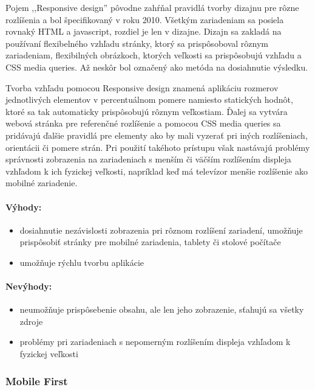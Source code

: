 Pojem ,,Responsive design'' pôvodne zahŕňal pravidlá tvorby dizajnu pre rôzne rozlíšenia a bol špecifikovaný v roku 2010. Všetkým zariadeniam sa posiela rovnaký HTML a javascript, rozdiel je len v dizajne. Dizajn sa zakladá na používaní flexibelného vzhľadu stránky, ktorý sa prispôsoboval rôznym zariadeniam, flexibilných obrázkoch, ktorých veľkosti sa prispôsobujú vzhľadu a CSS media queries. \cite{responsive, mediaqueries} Až neskôr bol označený ako metóda na dosiahnutie výsledku.

Tvorba vzhľadu pomocou Responsive design znamená aplikáciu rozmerov jednotlivých elementov v percentuálnom pomere namiesto statických hodnôt, ktoré sa tak automaticky prispôsobujú rôznym veľkostiam. Ďalej sa vytvára webová stránka pre referenčné rozlíšenie a pomocou CSS media queries sa pridávajú ďalšie pravidlá pre elementy ako by mali vyzerať pri iných rozlíšeniach, orientácii či pomere strán. Pri použití takéhoto prístupu však nastávajú problémy správnosti zobrazenia na zariadeniach s menším či väčším rozlíšením displeja vzhľadom k ich fyzickej veľkosti, napríklad keď má televízor menšie rozlíšenie ako mobilné zariadenie.


\paragraph{Výhody:}
\begin{itemize}
	\item dosiahnutie nezávislosti zobrazenia pri rôznom rozlíšení zariadení, umožňuje prispôsobiť stránky pre mobilné zariadenia, tablety či stolové počítače
	\item umožňuje rýchlu tvorbu aplikácie
\end{itemize}

\paragraph{Nevýhody:}
\begin{itemize}
	\item neumožňuje prispôsebenie obsahu, ale len jeho zobrazenie, sťahujú sa všetky zdroje
	\item problémy pri zariadeniach s nepomerným rozlíšením displeja vzhľadom k fyzickej veľkosti
\end{itemize}



\subsubsection{Mobile First} %
\label{ssub:mobile_first_responsive_design}

